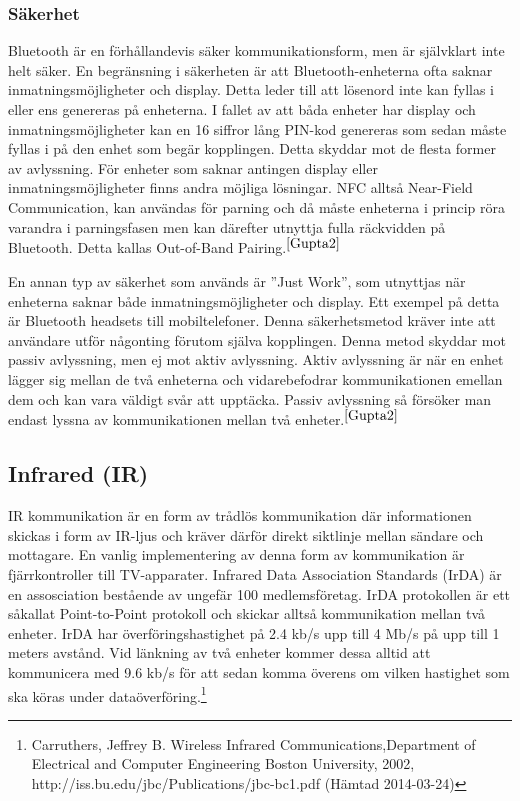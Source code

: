 \documentclass[a4paper,12pt,fleqn]{article}
\begin{document}
\subsubsection{Säkerhet}
Bluetooth är en förhållandevis säker kommunikationsform, men är självklart inte helt säker. En begränsning i säkerheten är att Bluetooth-enheterna ofta saknar inmatningsmöjligheter och display. Detta leder till att lösenord inte kan fyllas i eller ens genereras på enheterna. I fallet av att båda enheter har display och inmatningsmöjligheter kan en 16 siffror lång PIN-kod genereras som sedan måste fyllas i på den enhet som begär kopplingen. Detta skyddar mot de flesta former av avlyssning.
För enheter som saknar antingen display eller inmatningsmöjligheter finns andra möjliga lösningar. NFC alltså Near-Field Communication, kan användas för parning och då måste enheterna i princip röra varandra i parningsfasen men kan därefter utnyttja fulla räckvidden på Bluetooth. Detta kallas Out-of-Band Pairing.$^{\ref{Gupta2}}$

En annan typ av säkerhet som används är ''Just Work'', som utnyttjas när enheterna saknar både inmatningsmöjligheter och display. Ett exempel på detta är Bluetooth headsets till mobiltelefoner. Denna säkerhetsmetod kräver inte att användare utför någonting förutom själva kopplingen. Denna metod skyddar mot passiv avlyssning, men ej mot aktiv avlyssning. 
Aktiv avlyssning är när en enhet lägger sig mellan de två enheterna och vidarebefodrar kommunikationen emellan dem och kan vara väldigt svår att upptäcka.
Passiv avlyssning så försöker man endast lyssna av kommunikationen mellan två enheter.$^{\ref{Gupta2}}$
 
\subsection{Infrared (IR)}
IR kommunikation är en form av trådlös kommunikation där informationen skickas i form av IR-ljus och kräver därför direkt siktlinje mellan sändare och mottagare. En vanlig implementering av denna form av kommunikation är fjärrkontroller till TV-apparater.
Infrared Data Association Standards (IrDA) är en assosciation bestående av ungefär 100 medlemsföretag. IrDA protokollen är ett såkallat Point-to-Point protokoll och skickar alltså kommunikation mellan två enheter. IrDA har överföringshastighet på 2.4 kb/s upp till 4 Mb/s på upp till 1 meters avstånd. Vid länkning av två enheter kommer dessa alltid att kommunicera med 9.6 kb/s för att sedan komma överens om vilken hastighet som ska köras under dataöverföring.\footnote{\label{Carruthers}Carruthers, Jeffrey B. Wireless Infrared Communications,Department of Electrical and Computer Engineering
Boston University, 2002, http://iss.bu.edu/jbc/Publications/jbc-bc1.pdf (Hämtad 2014-03-24)}  
\end{document}
